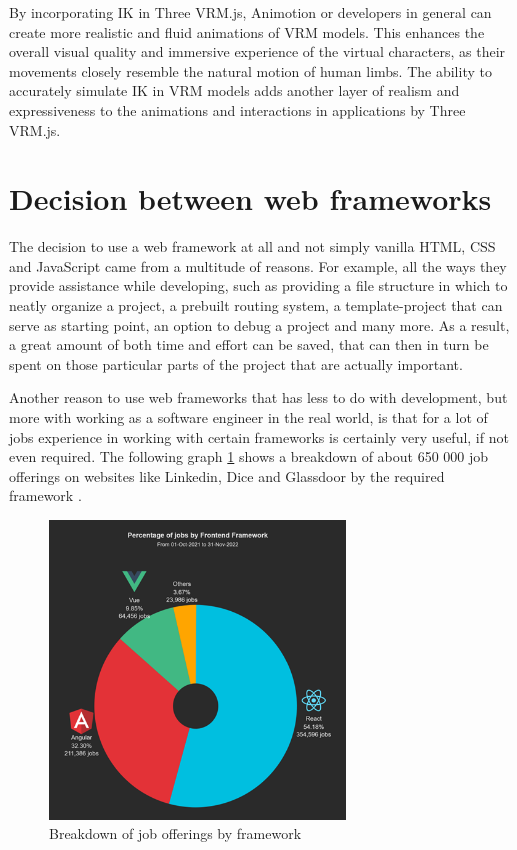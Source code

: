 By incorporating IK in Three VRM.js, Animotion or developers in general can create more realistic and fluid animations of VRM models. 
This enhances the overall visual quality and immersive experience of the virtual characters, as their movements 
closely resemble the natural motion of human limbs. The ability to accurately simulate IK in VRM models adds another 
layer of realism and expressiveness to the animations and interactions in applications by Three VRM.js. \cite{ikinthree}

\section{Decision between web frameworks}
The decision to use a web framework at all and not simply vanilla HTML, CSS and JavaScript came from a multitude of reasons.
For example, all the ways they provide assistance while developing, such as providing a file structure in which to neatly 
organize a project, a prebuilt routing system, a template-project that can serve as starting point, an option to debug a 
project and many more. As a result, a great amount of both time and effort can be saved, that can then in turn be spent on 
those particular parts of the project that are actually important.

Another reason to use web frameworks that has less to do with development, but more with working as a software engineer in 
the real world, is that for a lot of jobs experience in working with certain frameworks is certainly very useful, if not 
even required. The following graph \ref{fig:WebframeworkJobs} shows a breakdown of about 650 000 job offerings on websites like Linkedin, 
Dice and Glassdoor by the required framework \cite{WebframeworkJobs}.
\\
\begin{figure}[htb]
  \centering
  \includegraphics[width=0.7\textwidth]{pics/piechartwebframework.png}
  \caption{Breakdown of job offerings by framework}
  \label{fig:WebframeworkJobs}
\end{figure}
\\
